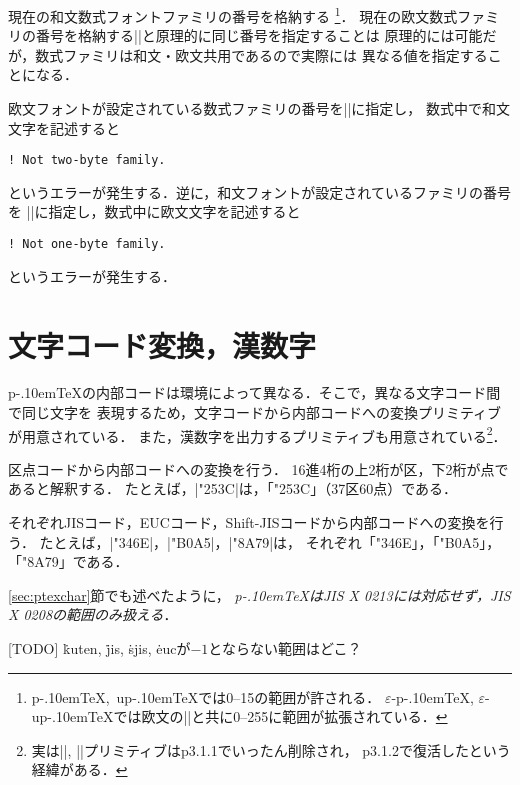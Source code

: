 \documentclass[a4paper,11pt,nomag]{jsarticle}
\def\epTeX{$\varepsilon$-\pTeX}\def\eTeX{$\varepsilon$-\TeX}
\def\eupTeX{$\varepsilon$-\upTeX}\def\upTeX{u\pTeX}
\def\pTeX{p\kern-.10em\TeX}
\begin{document}
\begin{cslist}
\csitem[\.{jfam}=<number>]
  現在の和文数式フォントファミリの番号を格納する
  \footnote{\pTeX,~\upTeX では0--15の範囲が許される．
  \epTeX, \eupTeX では欧文の|\fam|と共に0--255に範囲が拡張されている．}．
  現在の欧文数式ファミリの番号を格納する|\fam|と原理的に同じ番号を指定することは
  原理的には可能だが，数式ファミリは和文・欧文共用であるので実際には
  異なる値を指定することになる．

  欧文フォントが設定されている数式ファミリの番号を|\jfam|に指定し，
  数式中で和文文字を記述すると
\begin{verbatim}
! Not two-byte family.
\end{verbatim}
  というエラーが発生する．逆に，和文フォントが設定されているファミリの番号を
  |\fam|に指定し，数式中に欧文文字を記述すると
\begin{verbatim}
! Not one-byte family.
\end{verbatim}
  というエラーが発生する．
\end{cslist}

\section{文字コード変換，漢数字}

\pTeX の内部コードは環境によって異なる．そこで，異なる文字コード間で同じ文字を
表現するため，文字コードから内部コードへの変換プリミティブが用意されている．
また，漢数字を出力するプリミティブも用意されている\footnote{%
実は|\kansuji|, |\kansujichar|プリミティブはp3.1.1でいったん削除され，
p3.1.2で復活したという経緯がある．}．

\begin{cslist}
  区点コードから内部コードへの変換を行う．
  16進4桁の上2桁が区，下2桁が点であると解釈する．
  たとえば，|\char\kuten"253C|は，「\char\kuten"253C」（37区60点）である．

  それぞれJISコード，EUCコード，Shift-JISコードから内部コードへの変換を行う．
  たとえば，|\char\jis"346E|，|\char\euc"B0A5|，|\char\sjis"8A79|は，
  それぞれ「\char\jis"346E」，「\char\euc"B0A5」，「\char\sjis"8A79」である．
\end{cslist}

\begin{dangerous}
 \ref{sec:ptexchar}節でも述べたように，
 \emph{\pTeX はJIS X 0213には対応せず，JIS X 0208の範囲のみ扱える}．

 [TODO] \.{kuten}, \.{jis}, \.{sjis}, \.{euc}が$-1$とならない範囲はどこ？
\end{dangerous}
\end{document}
